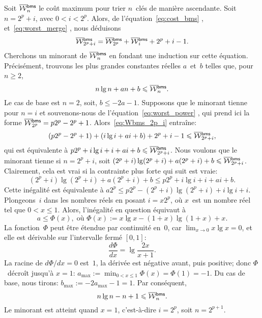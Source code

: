 
Soit \(\OW{\fun{bms}}{n}\) le coût
maximum pour trier \(n\)~clés de manière ascendante. Soit \(n=2^p+i\),
avec \(0 < i < 2^p\). Alors, de l'équation~\eqref{eq:cost_bms}
, et~\eqref{eq:worst_merge}
, nous déduisons
\begin{equation}
\OW{\fun{bms}}{2^p+i} = \OW{\fun{bms}}{2^p} + \OW{\fun{bms}}{i} + 2^p
+ i - 1.
\label{eq:Wbms_2p_i}
\end{equation}
Cherchons un minorant de \(\OW{\fun{bms}}{n}\) en fondant une
induction sur cette équation. Précisément, trouvons les plus grandes
constantes réelles \(a\)~et~\(b\) telles que, pour \(n \geqslant 2\),
\begin{equation*}
n\lg n + an + b \leqslant \OW{\fun{bms}}{n}.
\end{equation*}
Le cas de base est \(n=2\), soit, \(b \leqslant -2a - 1\). Supposons
que le minorant tienne pour \(n=i\) et souvenons-nous de
l'équation~\eqref{eq:worst_power} , qui prend
ici la forme \(\OW{\fun{bms}}{2^p} = p2^p - 2^p +
1\). Alors~\eqref{eq:Wbms_2p_i} entraîne:
\begin{equation*}
(p2^p - 2^p + 1) + (i\lg i + ai + b) + 2^p + i - 1 \leqslant
\OW{\fun{bms}}{2^p+i},
\end{equation*}
qui est équivalente à \(p2^p + i\lg i + i + ai + b \leqslant
\OW{\fun{bms}}{2^p+i}\). Nous voulons que le minorant tienne si
\(n=2^p+i\), soit \((2^p+i)\lg(2^p+i) + a(2^p+i) + b \leqslant
\OW{\fun{bms}}{2^p+i}\). Clairement, cela est vrai si la contrainte
plus forte qui suit est vraie:
\begin{equation*}
(2^p+i)\lg(2^p+i) + a(2^p+i) + b \leqslant p2^p + i\lg i + i + ai + b.
\end{equation*}
Cette inégalité est équivalente à \(a2^p \leqslant p2^p -
(2^p+i)\lg(2^p+i) + i\lg i + i\). Plongeons~\(i\) dans les nombres
réels en posant \(i=x2^p\), où \(x\)~est un nombre réel tel que \(0 <
x \leqslant 1\). Alors, l'inégalité en question équivaut à
\begin{equation*}
a \leqslant \Phi(x),\; \text{où \(\Phi(x) := x\lg x -
  (1+x)\lg(1+x) + x\).}
\end{equation*}
La fonction~\(\Phi\) peut être étendue par continuité en~\(0\), car
\(\lim_{x \to 0} x\lg x = 0\), et elle est dérivable sur l'intervalle
fermé \([0,1]\):
\begin{equation*}
\frac{d\Phi}{dx} = \lg\frac{2x}{x+1}.
\end{equation*}
La racine de \(d\Phi/dx = 0\) est~\(1\), la dérivée est négative
avant, puis positive; donc \(\Phi\)~décroît jusqu'à \(x=1\):
\(a_{\max} := \min_{0 < x \leqslant 1}\Phi(x) = \Phi(1) = -1\). Du cas
de base, nous tirons: \(b_{\max} := -2a_{\max} - 1 = 1\). Par
conséquent,
\begin{equation*}
n\lg n - n + 1 \leqslant \OW{\fun{bms}}{n}.
\end{equation*}
Le minorant est atteint quand \(x=1\), c'est-à-dire \(i=2^p\), soit
\(n=2^{p+1}\).

